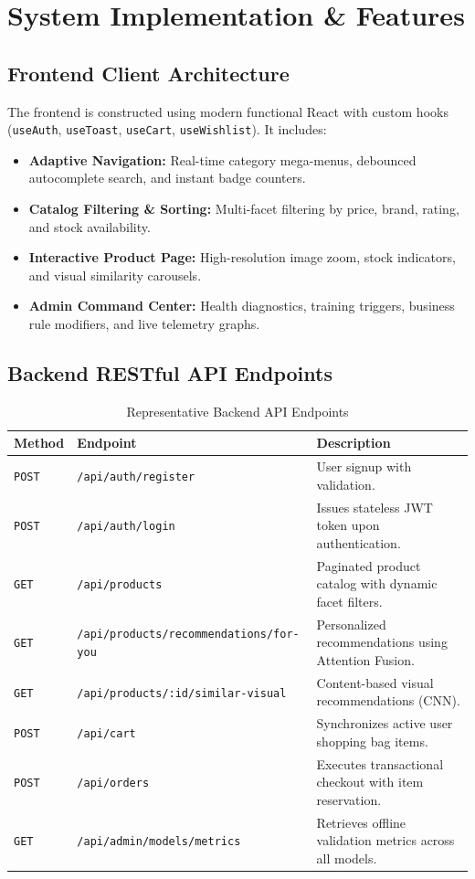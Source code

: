 \documentclass[12pt,a4paper,oneside]{report}
\begin{document}
\chapter{System Implementation \& Features}

\section{Frontend Client Architecture}
The frontend is constructed using modern functional React with custom hooks (\texttt{useAuth}, \texttt{useToast}, \texttt{useCart}, \texttt{useWishlist}). It includes:
\begin{itemize}
    \item \textbf{Adaptive Navigation:} Real-time category mega-menus, debounced autocomplete search, and instant badge counters.
    \item \textbf{Catalog Filtering \& Sorting:} Multi-facet filtering by price, brand, rating, and stock availability.
    \item \textbf{Interactive Product Page:} High-resolution image zoom, stock indicators, and visual similarity carousels.
    \item \textbf{Admin Command Center:} Health diagnostics, training triggers, business rule modifiers, and live telemetry graphs.
\end{itemize}

\section{Backend RESTful API Endpoints}
\begin{table}[H]
\centering
\caption{Representative Backend API Endpoints}
\begin{tabularx}{\textwidth}{l l X}
\toprule
\textbf{Method} & \textbf{Endpoint} & \textbf{Description} \\
\midrule
\texttt{POST} & \texttt{/api/auth/register} & User signup with validation. \\
\texttt{POST} & \texttt{/api/auth/login} & Issues stateless JWT token upon authentication. \\
\texttt{GET} & \texttt{/api/products} & Paginated product catalog with dynamic facet filters. \\
\texttt{GET} & \texttt{/api/products/recommendations/for-you} & Personalized recommendations using Attention Fusion. \\
\texttt{GET} & \texttt{/api/products/:id/similar-visual} & Content-based visual recommendations (CNN). \\
\texttt{POST} & \texttt{/api/cart} & Synchronizes active user shopping bag items. \\
\texttt{POST} & \texttt{/api/orders} & Executes transactional checkout with item reservation. \\
\texttt{GET} & \texttt{/api/admin/models/metrics} & Retrieves offline validation metrics across all models. \\
\bottomrule
\end{tabularx}
\end{table}
\end{document}
